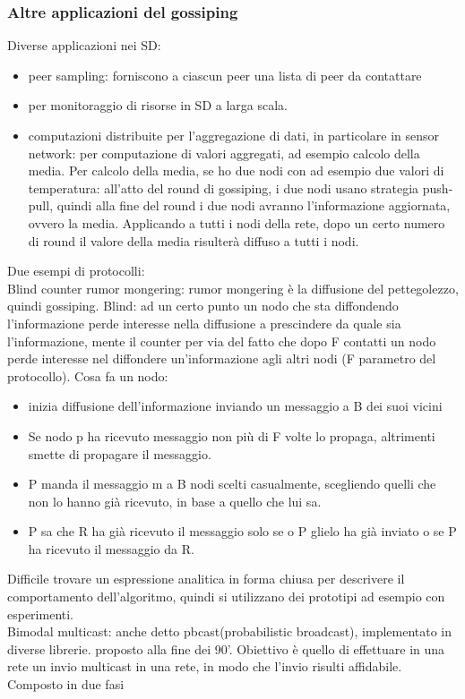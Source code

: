\documentclass{article}
\begin{document}
\subsubsection{Altre applicazioni del gossiping}
Diverse applicazioni nei SD:
\begin{itemize}
\item peer sampling: forniscono a ciascun peer una lista di peer da contattare
\item per monitoraggio di risorse in SD a larga scala.
\item computazioni distribuite per l'aggregazione di dati, in particolare in sensor network: per computazione di valori aggregati, ad esempio calcolo della media. Per calcolo della media, se ho due nodi con ad esempio due valori di temperatura: all'atto del round di gossiping, i due nodi usano strategia push-pull, quindi alla fine del round i due nodi avranno l'informazione aggiornata, ovvero la media. Applicando a tutti i nodi della rete, dopo un certo numero di round il valore della media risulterà diffuso a tutti i nodi.
\end{itemize}
Due esempi di protocolli:\\
Blind counter rumor mongering: rumor mongering è la diffusione del pettegolezzo, quindi gossiping. Blind: ad un certo punto un nodo che sta diffondendo l'informazione perde interesse nella diffusione a prescindere da quale sia l'informazione, mente il counter per via del fatto che dopo F contatti un nodo perde interesse nel diffondere un'informazione agli altri nodi (F parametro del protocollo). Cosa fa un nodo: 
\begin{itemize}
\item inizia diffusione dell'informazione inviando un messaggio a B dei suoi vicini
\item Se nodo p ha ricevuto messaggio non più di F volte lo propaga, altrimenti smette di propagare il messaggio.
\item P manda il messaggio m a B nodi scelti casualmente, scegliendo quelli che non lo hanno già ricevuto, in base a quello che lui sa.
\item P sa che R ha già ricevuto il messaggio solo se o P glielo ha già inviato o se P ha ricevuto il messaggio da R.
\end{itemize}
Difficile trovare un espressione analitica in forma chiusa per descrivere il comportamento dell'algoritmo, quindi si utilizzano dei prototipi ad esempio con esperimenti.\\ Bimodal multicast: anche detto pbcast(probabilistic broadcast), implementato in diverse librerie. proposto alla fine dei 90'. Obiettivo è quello di effettuare in una rete un invio multicast in una rete, in modo che l'invio risulti affidabile. Composto in due fasi
\end{document}
